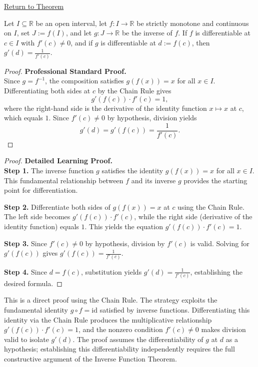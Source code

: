 \newpage
{}
\label{prf:derivative-inverse-function-at-point}

\begin{remark*}[Return]
\hyperref[thm:inverse-function-theorem-monotone]{Return to Theorem}
\end{remark*}

\begin{theorem*}
Let $I \subseteq \mathbb{R}$ be an open interval, let $f : I \to \mathbb{R}$
be strictly monotone and continuous on $I$, set $J := f(I)$, and let
$g : J \to \mathbb{R}$ be the inverse of $f$. If $f$ is differentiable
at $c \in I$ with $f'(c) \neq 0$, and if $g$ is differentiable at
$d := f(c)$, then $g'(d) = \frac{1}{f'(c)}$.
\end{theorem*}

\begin{proof}
\textbf{Professional Standard Proof.}~\\
Since $g = f^{-1}$, the composition satisfies $g(f(x)) = x$ for all $x \in I$.
Differentiating both sides at $c$ by the Chain Rule gives
\[
  g'(f(c)) \cdot f'(c) = 1,
\]
where the right-hand side is the derivative of the identity function
$x \mapsto x$ at $c$, which equals $1$. Since $f'(c) \neq 0$ by hypothesis, 
division yields
\[
  g'(d) = g'(f(c)) = \frac{1}{f'(c)}.
\]
\end{proof}

\begin{proof}
\textbf{Detailed Learning Proof.}~\\

\textbf{Step 1.} The inverse function $g$ satisfies the identity $g(f(x)) = x$ for all $x \in I$. This fundamental relationship between $f$ and its inverse $g$ provides the starting point for differentiation.

\textbf{Step 2.} Differentiate both sides of $g(f(x)) = x$ at $c$ using the Chain Rule. The left side becomes $g'(f(c)) \cdot f'(c)$, while the right side (derivative of the identity function) equals $1$. This yields the equation $g'(f(c)) \cdot f'(c) = 1$.

\textbf{Step 3.} Since $f'(c) \neq 0$ by hypothesis, division by $f'(c)$ is valid. Solving for $g'(f(c))$ gives $g'(f(c)) = \frac{1}{f'(c)}$.

\textbf{Step 4.} Since $d = f(c)$, substitution yields $g'(d) = \frac{1}{f'(c)}$, establishing the desired formula.
\end{proof}

\begin{remark*}
This is a direct proof using the Chain Rule. The strategy exploits the fundamental identity $g \circ f = \text{id}$ satisfied by inverse functions. Differentiating this identity via the Chain Rule produces the multiplicative relationship $g'(f(c)) \cdot f'(c) = 1$, and the nonzero condition $f'(c) \neq 0$ makes division valid to isolate $g'(d)$. The proof assumes the differentiability of $g$ at $d$ as a hypothesis; establishing this differentiability independently requires the full constructive argument of the Inverse Function Theorem.
\end{remark*}

